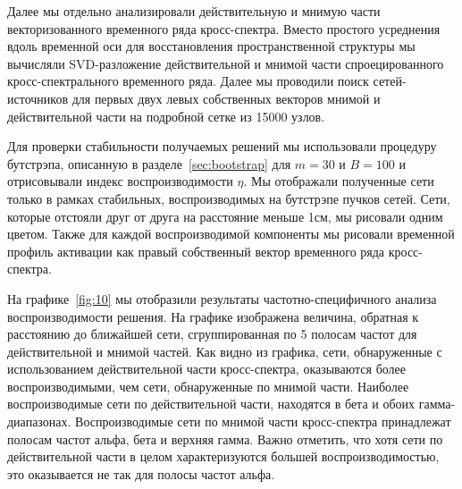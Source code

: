 Далее мы отдельно анализировали действительную и мнимую части векторизованного
временного ряда кросс-спектра. Вместо простого усреднения вдоль временной оси
для восстановления пространственной структуры мы вычисляли SVD-разложение
действительной и мнимой части спроецированного кросс-спектрального временного
ряда. Далее мы проводили поиск сетей-источников для первых двух левых
собственных векторов мнимой и действительной части на подробной сетке из 15000
узлов.

Для проверки стабильности получаемых решений мы использовали процедуру
бутстрэпа, описанную в разделе~\ref{sec:bootstrap} для $m=30$ и $B=100$ и
отрисовывали индекс воспроизводимости $\eta$.  Мы отображали полученные сети
только в рамках стабильных, воспроизводимых на бутстрэпе пучков сетей. Сети,
которые отстояли друг от друга на расстояние меньше 1см, мы рисовали одним
цветом.  Также для каждой воспроизводимой компоненты мы рисовали временной
профиль активации как правый собственный вектор временного ряда кросс-спектра.




На графике~\ref{fig:10} мы отобразили результаты частотно-специфичного
анализа воспроизводимости решения. На графике изображена величина, обратная к
расстоянию до ближайшей сети, сгруппированная по 5 полосам частот для
действительной и мнимой частей. Как видно из графика, сети, обнаруженные с
использованием действительной части кросс-спектра, оказываются более
воспроизводимыми, чем сети, обнаруженные по мнимой части. Наиболее воспроизводимые
сети по действительной части, находятся в бета и обоих гамма-диапазонах.
Воспроизводимые сети по мнимой части кросс-спектра принадлежат полосам частот
альфа, бета и верхняя гамма. Важно отметить, что хотя сети по действительной части
в целом характеризуются большей воспроизводимостью, это оказывается не так для
полосы частот альфа.

